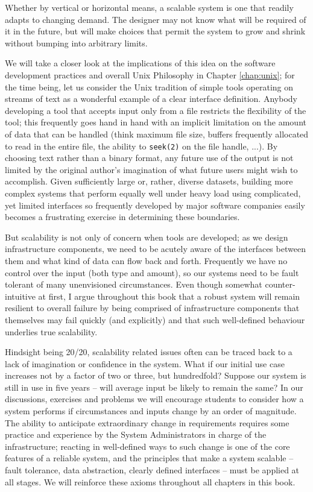 Whether by vertical or horizontal means, a scalable
system is one that readily adapts to changing demand.
The designer may not know what will be required of it
in the future, but will make choices that permit the
system to grow and shrink without bumping into
arbitrary limits.

We will take a closer look at the implications of this
idea on the software development practices and overall
Unix Philosophy in Chapter \ref{chap:unix}; for the
time being, let us consider the Unix tradition of
simple tools operating on streams of text as a
wonderful example of a clear interface definition.
Anybody developing a tool that accepts input only from
a file restricts the flexibility of the tool; this
frequently goes hand in hand with an implicit
limitation on the amount of data that can be handled
(think maximum file size, buffers frequently allocated
to read in the entire file, the ability to
\verb+seek(2)+ on the file handle, ...).  By choosing
text rather than a binary format, any future use of
the output is not limited by the original author's
imagination of what future users might wish to
accomplish.  Given sufficiently large or, rather,
diverse datasets, building more complex systems that
perform equally well under heavy load using
complicated, yet limited interfaces so frequently
developed by major software companies easily becomes a
frustrating exercise in determining these
boundaries.

But scalability is not only of concern when tools are
developed; as we design infrastructure components, we
need to be acutely aware of the interfaces between
them and what kind of data can flow back and forth.
Frequently we have no control over the input (both
type and amount), so our systems need to be fault
tolerant of many unenvisioned circumstances.  Even
though somewhat counter-intuitive at first, I argue
throughout this book that a robust system will remain
resilient to overall failure by being comprised of
infrastructure components that themselves may fail
quickly (and explicitly) and that such well-defined
behaviour underlies true scalability.

Hindsight being 20/20, scalability related issues
often can be traced back to a lack of imagination or
confidence in the system.  What if our initial use
case increases not by a factor of two or three, but
hundredfold?  Suppose our system is still in use in
five years -- will average input be likely to remain
the same?  In our discussions, exercises and problems
we will encourage students to consider how a system
performs if circumstances and inputs change by an
order of magnitude.  The ability to anticipate
extraordinary change in requirements requires some
practice and experience by the System Administrators
in charge of the infrastructure; reacting in
well-defined ways to such change is one of the core
features of a reliable system, and the principles that
make a system scalable -- fault tolerance, data
abstraction, clearly defined interfaces -- must be
applied at all stages.  We will reinforce these axioms
throughout all chapters in this book.


